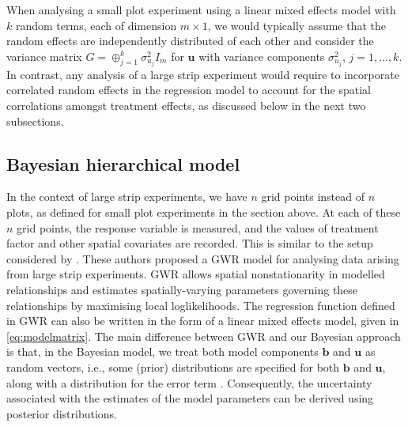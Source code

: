 \documentclass[a4paper]{article}   	%
\begin{document}
	When analysing a small plot experiment using a linear mixed effects model with $k$ random terms, each of dimension $m\times 1$, we would typically assume that the random effects are independently distributed of each other and consider the variance matrix $G=\oplus_{j=1}^k\sigma_{u_j}^2I_m$ for $\bm{u}$ with variance components $\sigma^{2}_{u_j}$, $j=1,\ldots,k$. In contrast, any analysis of a large strip experiment would require to incorporate correlated random effects in the regression model to account for the spatial correlations amongst treatment effects, as discussed below in the next two subsections. 
	
	\subsection{Bayesian hierarchical model}\label{sec:hierarchical}
	
	In the context of large strip experiments, we have $n$ grid points instead of $n$ plots, as defined for small plot experiments in the section above. At each of these $n$ grid points, the response variable is measured, and the values of treatment factor and other spatial covariates are recorded. This is similar to the setup considered by \textcite{Rakshit2020Novel}. These authors proposed a GWR model for analysing data arising from large strip experiments. GWR allows spatial nonstationarity in modelled relationships and estimates spatially-varying parameters governing these relationships by maximising local loglikelihoods. The regression function defined in GWR can also be written in the form of a linear mixed effects model, given in \eqref{eq:modelmatrix}. The main difference between GWR and our Bayesian approach is that, in the Bayesian model, we treat both model components $\bm{b}$ and $\bm{u}$ as random vectors, i.e., some (prior) distributions are specified for both $\bm{b}$ and $\bm{u}$, along with a distribution for the error term \parencite{Burkner2017Brms}. Consequently, the uncertainty associated with the estimates of the model parameters can be derived using posterior distributions. 	
	
\end{document}
